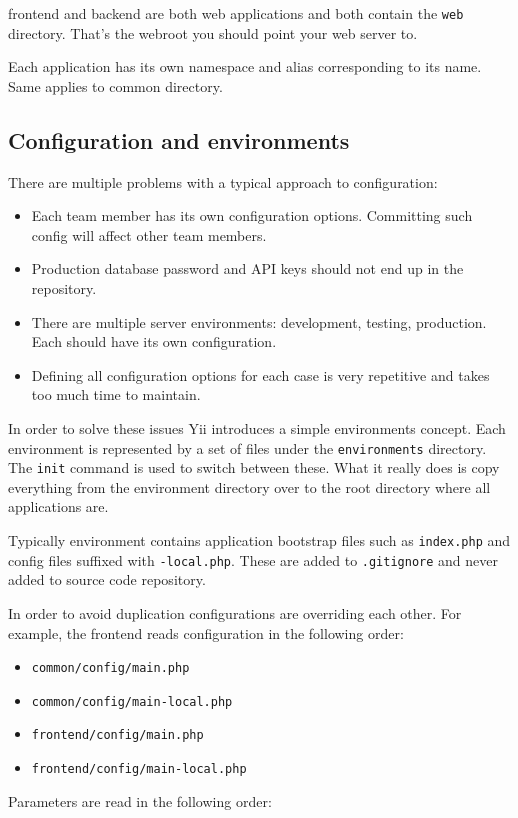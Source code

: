 frontend and backend are both web applications and both contain the \lstinline|web| directory. That's the webroot you should point your
web server to.

Each application has its own namespace and alias corresponding to its name. Same applies to common directory.

\subsection{Configuration and environments}
There are multiple problems with a typical approach to configuration:

\begin{itemize}
\item Each team member has its own configuration options. Committing such config will affect other team members.
\item Production database password and API keys should not end up in the repository.
\item There are multiple server environments: development, testing, production. Each should have its own configuration.
\item Defining all configuration options for each case is very repetitive and takes too much time to maintain.
\end{itemize}
In order to solve these issues Yii introduces a simple environments concept. Each environment is represented
by a set of files under the \lstinline|environments| directory. The \lstinline|init| command is used to switch between these. What it really does is
copy everything from the environment directory over to the root directory where all applications are.

Typically environment contains application bootstrap files such as \lstinline|index.php| and config files suffixed with
\lstinline|-local.php|. These are added to \lstinline|.gitignore| and never added to source code repository.

In order to avoid duplication configurations are overriding each other. For example, the frontend reads configuration in the
following order:

\begin{itemize}
\item \lstinline|common/config/main.php|
\item \lstinline|common/config/main-local.php|
\item \lstinline|frontend/config/main.php|
\item \lstinline|frontend/config/main-local.php|
\end{itemize}
Parameters are read in the following order:

